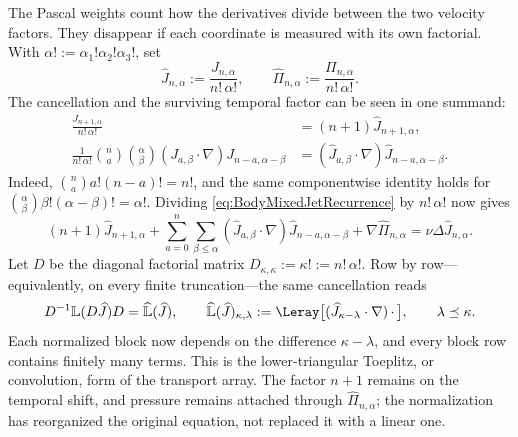 The Pascal weights count how the derivatives divide between the two velocity factors.
They disappear if each coordinate is measured with its own factorial.
With \(\alpha!:=\alpha_1!\alpha_2!\alpha_3!\), set
\[
  \widehat J_{n,\alpha}
  :=\frac{J_{n,\alpha}}{n!\,\alpha!},
  \qquad
  \widehat\Pi_{n,\alpha}
  :=\frac{\Pi_{n,\alpha}}{n!\,\alpha!}.
\]
The cancellation and the surviving temporal factor can be seen in one summand:
\begin{align*}
  \frac{J_{n+1,\alpha}}{n!\,\alpha!}
  &=(n+1)\widehat J_{n+1,\alpha},
  \\
  \frac{1}{n!\,\alpha!}
  \binom{n}{a}\binom{\alpha}{\beta}
  (J_{a,\beta}\cdot\nabla)J_{n-a,\alpha-\beta}
  &=(\widehat J_{a,\beta}\cdot\nabla)
    \widehat J_{n-a,\alpha-\beta}.
\end{align*}
Indeed,
\(\binom{n}{a}a!(n-a)!=n!\), and the same componentwise identity holds for
\(\binom{\alpha}{\beta}\beta!(\alpha-\beta)!=\alpha!\).
Dividing \eqref{eq:BodyMixedJetRecurrence} by \(n!\,\alpha!\) now gives
\[
  (n+1)\widehat J_{n+1,\alpha}
  +\sum_{a=0}^{n}\sum_{\beta\leq\alpha}
    (\widehat J_{a,\beta}\cdot\nabla)
    \widehat J_{n-a,\alpha-\beta}
  +\nabla\widehat\Pi_{n,\alpha}
  =\nu\Delta\widehat J_{n,\alpha}.
\]
Let \(D\) be the diagonal factorial matrix
\(D_{\kappa,\kappa}:=\kappa!:=n!\,\alpha!\).
Row by row---equivalently, on every finite truncation---the same cancellation reads
\[
  D^{-1}\mathbb L(D\widehat J)D
  =\widehat{\mathbb L}(\widehat J),
  \qquad
  \widehat{\mathbb L}(\widehat J)_{\kappa,\lambda}
  :=\Leray\bigl[(\widehat J_{\kappa-\lambda}\cdot\nabla)\,\mathord\cdot\,\bigr],
  \qquad \lambda\preceq\kappa.
\]
Each normalized block now depends on the difference \(\kappa-\lambda\), and every block row contains finitely many terms.
This is the lower-triangular Toeplitz, or convolution, form of the transport array.
The factor \(n+1\) remains on the temporal shift, and pressure remains attached through \(\widehat\Pi_{n,\alpha}\); the normalization has reorganized the original equation, not replaced it with a linear one.

